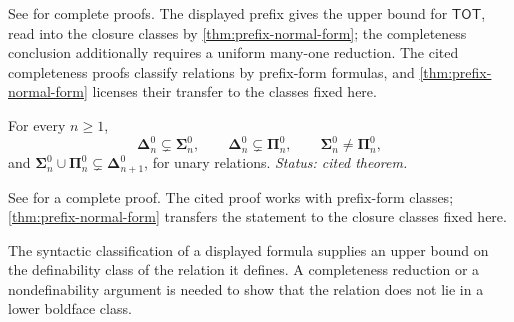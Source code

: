 See \cite{Shoenfield1967} for complete proofs.  The displayed prefix gives
the upper bound for \(\mathsf{TOT}\), read into the closure classes by
\cref{thm:prefix-normal-form}; the completeness conclusion additionally
requires a uniform many-one reduction.  The cited completeness proofs
classify relations by prefix-form formulas, and
\cref{thm:prefix-normal-form} licenses their transfer to the classes
fixed here.

\begin{theorem}
For every \(n\geq1\),
\[
  \boldsymbol{\Delta}^0_n\subsetneq\boldsymbol{\Sigma}^0_n,
  \qquad
  \boldsymbol{\Delta}^0_n\subsetneq\boldsymbol{\Pi}^0_n,
  \qquad
  \boldsymbol{\Sigma}^0_n\neq\boldsymbol{\Pi}^0_n,
\]
and
\(\boldsymbol{\Sigma}^0_n\cup\boldsymbol{\Pi}^0_n
\subsetneq\boldsymbol{\Delta}^0_{n+1}\), for unary relations.
\textit{Status: cited theorem.}
\end{theorem}

See \cite{Shoenfield1967} for a complete proof.  The cited proof works
with prefix-form classes; \cref{thm:prefix-normal-form} transfers the
statement to the closure classes fixed here.

\begin{warning}
The syntactic classification of a displayed formula supplies an upper bound
on the definability class of the relation it defines.  A completeness
reduction or a nondefinability argument is needed to show that the relation
does not lie in a lower boldface class.
\end{warning}
